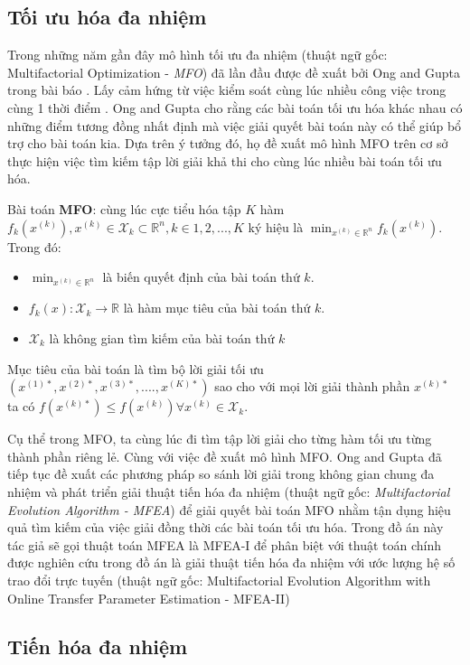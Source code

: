 % 
\subsection{Tối ưu hóa đa nhiệm}
Trong những năm gần đây mô hình tối ưu đa nhiệm (thuật ngữ gốc: Multifactorial Optimization - \emph{MFO}) đã lần đầu được đề xuất bởi Ong and Gupta trong bài báo \cite{ong2016evolutionary}. Lấy cảm hứng từ việc kiểm soát cùng lúc nhiều công việc trong cùng 1 thời điểm \cite{caruana1997multitask}. Ong and Gupta cho rằng các bài toán tối ưu hóa khác nhau có những điểm tương đồng nhất định mà việc giải quyết bài toán này có thể giúp bổ trợ cho bài toán kia. Dựa trên ý tưởng đó, họ đề xuất mô hình MFO trên cơ sở thực hiện việc tìm kiếm tập lời giải khả thi cho cùng lúc nhiều bài toán tối ưu hóa.
\begin{definition}
Bài toán \textbf{MFO}: cùng lúc cực tiểu hóa tập $K$ hàm $f_k(x^{(k)}), x^{(k)}\in \mathcal{X}_k \subset \mathbb{R}^n, k\in {1,2,...,K}$ ký hiệu là $\min_{x^{(k)}\in \mathbb{R}^n} f_k(x^{(k)})$. Trong đó:
\begin{itemize}
    \item $\min_{x^{(k)}\in \mathbb{R}^n}$ là biến quyết định của bài toán thứ $k$.
    \item $f_k(x): \mathcal{X}_k \rightarrow \mathbb{R}$ là hàm mục tiêu của bài toán thứ $k$.
    \item $\mathcal{X}_k$ là không gian tìm kiếm của bài toán thứ $k$
\end{itemize}
Mục tiêu của bài toán là tìm bộ lời giải tối ưu $(x^{(1)*},x^{(2)*}, x^{(3)*},...., x^{(K)*} )$ sao cho với mọi lời giải thành phần $x^{(k)*}$ ta có $f(x^{(k)*}) \leq f(x^{(k)}) \forall x^{(k)} \in \mathcal{X}_k$.
\end{definition}
Cụ thể trong MFO, ta cùng lúc đi tìm tập lời giải cho từng hàm tối ưu từng thành phần riêng lẻ. Cùng với việc đề xuất mô hình MFO. Ong and Gupta đã tiếp tục đề xuất các phương pháp so sánh lời giải trong không gian chung đa nhiệm và phát triển giải thuật tiến hóa đa nhiệm (thuật ngữ gốc: \emph{Multifactorial Evolution Algorithm - MFEA}) để giải quyết bài toán MFO nhằm tận dụng hiệu quả tìm kiếm của việc giải đồng thời các bài toán tối ưu hóa. Trong đồ án này tác giả sẽ gọi thuật toán MFEA là MFEA-I để phân biệt với thuật toán chính được nghiên cứu trong đồ án là giải thuật tiến hóa đa nhiệm với ước lượng hệ số trao đổi trực tuyến (thuật ngữ gốc: Multifactorial Evolution Algorithm with Online Transfer Parameter Estimation - MFEA-II)
\subsection{Tiến hóa đa nhiệm}

